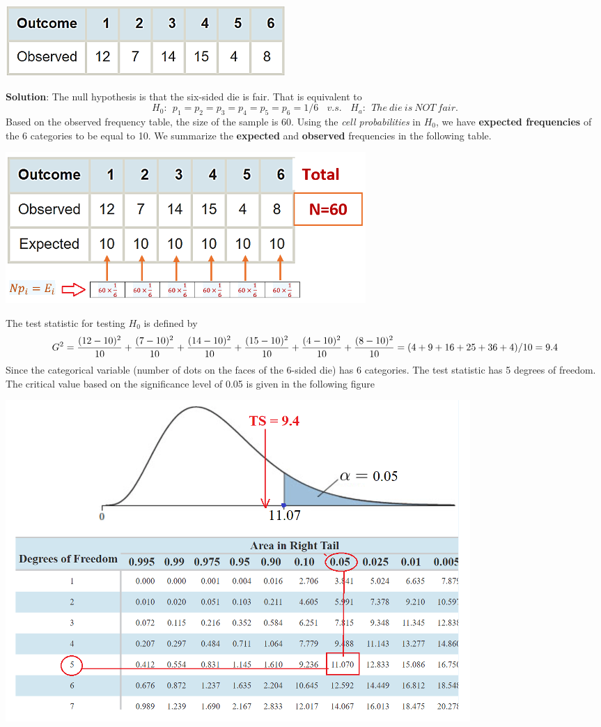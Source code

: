 \documentclass[
]{article}
\begin{document}
\begin{center}\includegraphics[width=0.35\linewidth]{week13/example03Data} \end{center}

\textbf{Solution}: The null hypothesis is that the six-sided die is
fair. That is equivalent to \[
H_0: \ \  p_1 = p_2 = p_3 = p_4 = p_5 = p_6 = 1/6 \ \ \ \ v.s. \ \ \ \ H_a: \ \ The \ die \ is \ NOT \ fair.
\] Based on the observed frequency table, the size of the sample is 60.
Using the \emph{cell probabilities} in \(H_0\), we have \textbf{expected
frequencies} of the 6 categories to be equal to 10. We summarize the
\textbf{expected} and \textbf{observed} frequencies in the following
table.

\begin{center}\includegraphics[width=0.45\linewidth]{week13/example03} \end{center}

The test statistic for testing \(H_0\) is defined by \[
G^2 = \frac{(12-10)^2}{10}+\frac{(7-10)^2}{10}+\frac{(14-10)^2}{10}+\frac{(15-10)^2}{10}
+\frac{(4-10)^2}{10}+\frac{(8-10)^2}{10} \\ =(4+9+16+25+36+4)/10=9.4
\] Since the categorical variable (number of dots on the faces of the
6-sided die) has 6 categories. The test statistic has 5 degrees of
freedom. The critical value based on the significance level of 0.05 is
given in the following figure

\begin{center}\includegraphics[width=0.85\linewidth]{week13/example03CV} \end{center}
\end{document}
